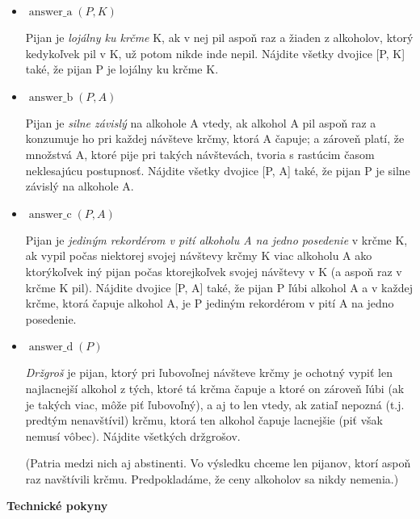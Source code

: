 \documentclass[10pt, a4paper]{article}
\DeclareMathOperator{\answera}{answer\_a}
\DeclareMathOperator{\answerb}{answer\_b}
\DeclareMathOperator{\answerc}{answer\_c}
\DeclareMathOperator{\answerd}{answer\_d}
\begin{document}
\begin{itemize}
\item $\answera(P, K)$

Pijan je \emph{lojálny ku krčme} K, ak v nej pil aspoň raz a žiaden z alkoholov, ktorý
kedykoľvek pil v K, už potom nikde inde nepil.
Nájdite všetky dvojice [P, K] také, že pijan P je lojálny ku krčme K.

\item $\answerb(P, A)$

Pijan je \emph{silne závislý} na alkohole A vtedy, ak
alkohol A pil aspoň raz a konzumuje ho pri každej návšteve krčmy, ktorá A čapuje; a zároveň platí, že
množstvá A, ktoré pije pri takých návštevách, tvoria s rastúcim časom neklesajúcu
postupnosť. Nájdite všetky dvojice [P, A] také, že pijan P je silne
závislý na alkohole A.

\item $\answerc(P, A)$

Pijan je \emph{jediným rekordérom v pití alkoholu A na jedno posedenie} v
krčme K, ak vypil počas niektorej svojej návštevy krčmy K viac
alkoholu A ako ktorýkoľvek iný pijan počas ktorejkoľvek svojej
návštevy v K (a aspoň raz v krčme K pil). Nájdite dvojice [P, A] také, že pijan P ľúbi alkohol A a
v každej krčme, ktorá čapuje alkohol A, je P jediným rekordérom v pití A na
jedno posedenie.

\item $\answerd(P)$

\emph{Držgroš} je pijan, ktorý pri ľubovoľnej návšteve krčmy je ochotný vypiť len najlacnejší alkohol z tých, ktoré tá krčma čapuje a ktoré on zároveň ľúbi (ak je takých viac, môže piť ľubovoľný), a aj to len vtedy, ak zatiaľ nepozná (t.j. predtým nenavštívil)
krčmu, ktorá ten alkohol čapuje lacnejšie (piť však nemusí vôbec). Nájdite všetkých držgrošov.

(Patria medzi nich aj abstinenti. Vo výsledku chceme len pijanov, ktorí aspoň raz navštívili krčmu. Predpokladáme, že ceny alkoholov sa
nikdy nemenia.)
\end{itemize}

\bigskip 
\bigskip 

\centerline{\bf\large Technické pokyny}

\bigskip
\end{document}

